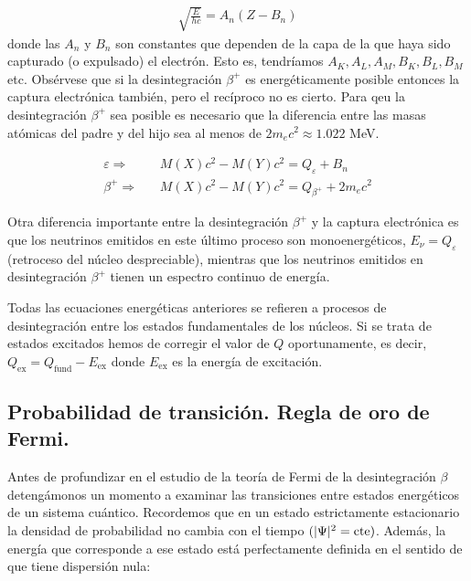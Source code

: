 \begin{eqnarray}
	\sqrt{\frac{E}{hc}} = A_n (Z-B_n)
\end{eqnarray}	
donde las $A_n$ y $B_n$ son constantes que dependen de la capa de la que haya sido capturado (o expulsado) el electrón. Esto es, tendríamos $A_K,A_L,A_M,B_K,B_L,B_M$ etc. Obsérvese que si la desintegración $\beta^+$ es energéticamente posible entonces la captura electrónica también, pero el recíproco no es cierto. Para qeu la desintegración $\beta^+$ sea posible es necesario que la diferencia entre las masas atómicas del padre y del hijo sea al menos de $2m_e c^2 \approx 1.022$ MeV. 

\begin{equation}
\begin{split}
\varepsilon \Longrightarrow \ \ & \ \ M(X)c^2 - M(Y)c^2 = Q_\varepsilon + B_n\\
\beta^+ \Longrightarrow \ \ & \ \ M(X)c^2- M(Y)c^2  = Q_{\beta^+} + 2m_ec^2
\end{split}
\end{equation}

Otra diferencia importante entre la desintegración $\beta^+$ y la captura electrónica es que los neutrinos emitidos en este último proceso son monoenergéticos, $E_\nu=Q_\varepsilon$ (retroceso del núcleo despreciable), mientras que los neutrinos emitidos en desintegración $\beta^+$ tienen un espectro continuo de energía.

Todas las ecuaciones energéticas anteriores se refieren a procesos de desintegración entre los estados fundamentales de los núcleos. Si se trata de estados excitados hemos de corregir el valor de $Q$ oportunamente, es decir, $Q_{\text{ex}} = Q_{\text{fund}}-E_{\text{ex}}$ donde $E_{\text{ex}}$ es la energía de excitación.



\subsection{Probabilidad de transición. Regla de oro de Fermi.}

Antes de profundizar en el estudio de la teoría de Fermi de la desintegración $\beta$ detengámonos un momento a examinar las transiciones entre estados energéticos de un sistema cuántico. Recordemos que en un estado estrictamente estacionario la densidad de probabilidad no cambia con el tiempo $(|\Psi|^2 = \text{cte})$. Además, la energía que corresponde a ese estado está perfectamente definida en el sentido de que tiene dispersión nula:

